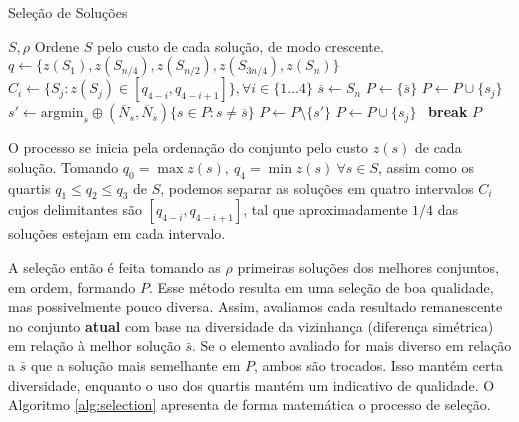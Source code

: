 \documentclass{MO824}
\begin{document}
    \begin{algorithm}[H]
    \caption{Seleção de Soluções}
    \label{alg:selection}
    \begin{algorithmic}[1]
        \REQUIRE $S, \rho$
        \STATE Ordene $S$ pelo custo de cada solução, de modo crescente.
        \STATE $q \leftarrow \{z(S_1), z(S_{n/4}), z(S_{n/2}), z(S_{3n/4}), z(S_n)\}$
        \STATE $C_i \leftarrow \{S_j: z(S_j) \in [q_{4-i},q_{4-i+1}]\}, \forall i \in \{1\dots 4\}$
        \STATE $\overline{s} \leftarrow S_n$
        \STATE $P \leftarrow \{\overline{s}\}$
                    \STATE $P \leftarrow P \cup \{s_j\}$  
                \ELSE
                    \STATE $s' \leftarrow \text{argmin}_s \oplus(\overline{N}_s, \overline{N}_{\overline{s}}) \{s \in P : s \ne \overline{s} \}$ 
                        \STATE $P \leftarrow P \setminus \{s'\}$  
                        \STATE $P \leftarrow P \cup \{s_j\}$  
                    \ENDIF
                \ENDIF
                \STATE {} \algorithmicthen \ \textbf{break}
            \ENDFOR
        \ENDFOR
        \RETURN $P$
    \end{algorithmic}
    \end{algorithm}
    
    O processo se inicia pela ordenação do conjunto pelo custo $z(s)$ de cada solução. Tomando $q_0 = \max z(s),~q_4 = \min z(s)~\forall s \in S$, assim como os quartis $q_1 \leq q_2 \leq q_3$ de $S$, podemos separar as soluções em quatro intervalos $C_i$ cujos delimitantes são $[q_{4-i},q_{4-i+1}]$, tal que aproximadamente $1/4$ das soluções estejam em cada intervalo.
    
    A seleção então é feita tomando as $\rho$ primeiras soluções dos melhores conjuntos, em ordem, formando $P$. Esse método resulta em uma seleção de boa qualidade, mas possivelmente pouco diversa. Assim, avaliamos cada resultado remanescente no conjunto \textbf{atual} com base na diversidade da vizinhança (diferença simétrica) em relação à melhor solução $\bar s$. Se o elemento avaliado for mais diverso em relação a $\bar s$ que a solução mais semelhante em $P$, ambos são trocados. Isso mantém certa diversidade, enquanto o uso dos quartis mantém um indicativo de qualidade. O Algoritmo \ref{alg:selection} apresenta de forma matemática o processo de seleção.
    
\end{document}
